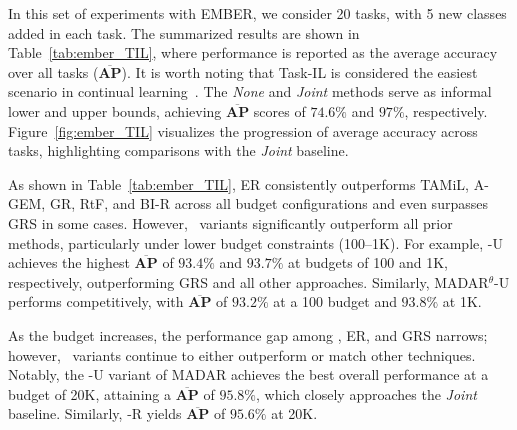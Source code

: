 In this set of experiments with EMBER, we consider 20 tasks, with 5 new classes added in each task. The summarized results are shown in Table~\ref{tab:ember_TIL}, where performance is reported as the average accuracy over all tasks ($\mathbf{\overline{AP}}$). It is worth noting that Task-IL is considered the easiest scenario in continual learning~\cite{van2022three, BIR}. The \textit{None} and \textit{Joint} methods serve as informal lower and upper bounds, achieving $\mathbf{\overline{AP}}$ scores of $74.6\%$ and $97\%$, respectively. Figure~\ref{fig:ember_TIL} visualizes the progression of average accuracy across tasks, highlighting comparisons with the \textit{Joint} baseline.

As shown in Table~\ref{tab:ember_TIL}, ER consistently outperforms TAMiL, A-GEM, GR, RtF, and BI-R across all budget configurations and even surpasses GRS in some cases. However, \system\ variants significantly outperform all prior methods, particularly under lower budget constraints (100–1K). For example, \system-U achieves the highest $\mathbf{\overline{AP}}$ of $93.4\%$ and $93.7\%$ at budgets of 100 and 1K, respectively, outperforming GRS and all other approaches. Similarly, MADAR$^\theta$-U performs competitively, with $\mathbf{\overline{AP}}$ of $93.2\%$ at a 100 budget and $93.8\%$ at 1K.

As the budget increases, the performance gap among \system, ER, and GRS narrows; however, \system\ variants continue to either outperform or match other techniques. Notably, the \system-U variant of MADAR achieves the best overall performance at a budget of 20K, attaining a $\mathbf{\overline{AP}}$ of $95.8\%$, which closely approaches the \textit{Joint} baseline. Similarly, \system-R yields $\mathbf{\overline{AP}}$ of $95.6\%$ at 20K.




